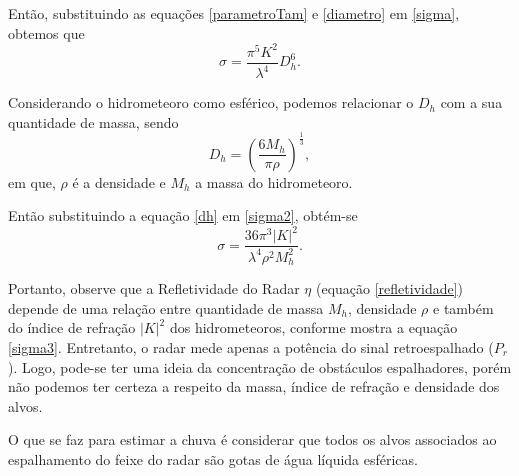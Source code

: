 
Então, substituindo as equações \ref{parametroTam} e \ref{diametro} em \ref{sigma}, obtemos que
\begin{equation}
\sigma = \dfrac{\pi^5 K^2  }{ \lambda^4 } D_h^6.
\label{sigma2}
\end{equation}

Considerando o hidrometeoro como esférico, podemos relacionar o $D_h$ com a sua quantidade de massa, sendo  
\begin{equation}
D_h = \left( \dfrac{6 M_h}{\pi \rho} \right)^{\frac{1}{3}},
\label{dh}
\end{equation}
em que, $\rho$ é a densidade e $M_h$ a massa do hidrometeoro.

Então substituindo a equação \ref{dh} em \ref{sigma2}, obtém-se
\begin{equation}
\sigma = \dfrac{36 \pi^3 |K|^2  }{ \lambda^4 \rho^2 M_h^2} .
\label{sigma3}
\end{equation}

Portanto, observe que a Refletividade do Radar $\eta$ (equação  \ref{refletividade}) depende  de uma relação entre quantidade de massa $M_h$, densidade $\rho$ e também do índice de refração $|K|^2$ dos hidrometeoros, conforme mostra a equação \ref{sigma3}. Entretanto, o radar mede apenas a potência do sinal retroespalhado ($P_r$). Logo, pode-se ter uma ideia da concentração de obstáculos espalhadores, porém não podemos ter certeza a respeito da massa, índice de refração e densidade dos alvos. 


O que se faz para estimar a chuva é considerar que todos os alvos associados ao espalhamento do feixe do radar são gotas de água líquida esféricas. 

